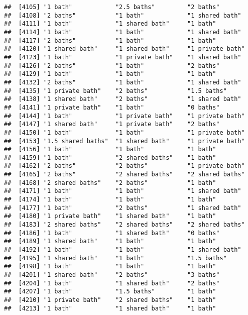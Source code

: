 \documentclass[
]{article}
\begin{document}
\begin{verbatim}
##  [4105] "1 bath"            "2.5 baths"         "2 baths"          
##  [4108] "2 baths"           "1 bath"            "1 shared bath"    
##  [4111] "1 bath"            "1 shared bath"     "1 bath"           
##  [4114] "1 bath"            "1 bath"            "1 shared bath"    
##  [4117] "2 baths"           "1 bath"            "1 bath"           
##  [4120] "1 shared bath"     "1 shared bath"     "1 private bath"   
##  [4123] "1 bath"            "1 private bath"    "1 shared bath"    
##  [4126] "2 baths"           "1 bath"            "2 baths"          
##  [4129] "1 bath"            "1 bath"            "1 bath"           
##  [4132] "2 baths"           "1 bath"            "1 shared bath"    
##  [4135] "1 private bath"    "2 baths"           "1.5 baths"        
##  [4138] "1 shared bath"     "2 baths"           "1 shared bath"    
##  [4141] "1 private bath"    "1 bath"            "0 baths"          
##  [4144] "1 bath"            "1 private bath"    "1 private bath"   
##  [4147] "1 shared bath"     "1 private bath"    "2 baths"          
##  [4150] "1 bath"            "1 bath"            "1 private bath"   
##  [4153] "1.5 shared baths"  "1 shared bath"     "1 private bath"   
##  [4156] "1 bath"            "1 bath"            "1 bath"           
##  [4159] "1 bath"            "2 shared baths"    "1 bath"           
##  [4162] "2 baths"           "2 baths"           "1 private bath"   
##  [4165] "2 baths"           "2 shared baths"    "2 shared baths"   
##  [4168] "2 shared baths"    "2 baths"           "1 bath"           
##  [4171] "1 bath"            "1 bath"            "1 shared bath"    
##  [4174] "1 bath"            "1 bath"            "1 bath"           
##  [4177] "1 bath"            "2 baths"           "1 shared bath"    
##  [4180] "1 private bath"    "1 shared bath"     "1 bath"           
##  [4183] "2 shared baths"    "2 shared baths"    "2 shared baths"   
##  [4186] "1 bath"            "1 shared bath"     "0 baths"          
##  [4189] "1 shared bath"     "1 bath"            "1 bath"           
##  [4192] "1 bath"            "1 bath"            "1 shared bath"    
##  [4195] "1 shared bath"     "1 bath"            "1.5 baths"        
##  [4198] "1 bath"            "1 bath"            "1 bath"           
##  [4201] "1 shared bath"     "2 baths"           "3 baths"          
##  [4204] "1 bath"            "1 shared bath"     "2 baths"          
##  [4207] "1 bath"            "1.5 baths"         "1 bath"           
##  [4210] "1 private bath"    "2 shared baths"    "1 bath"           
##  [4213] "1 bath"            "1 shared bath"     "1 bath"           

\end{verbatim}
\end{document}
